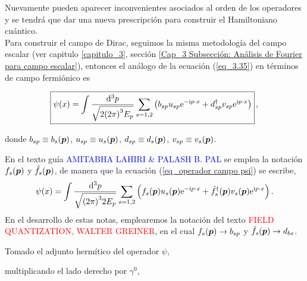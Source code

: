 Nuevamente pueden aparecer inconvenientes asociados al orden de los operadores y se tendrá que dar una nueva prescripción para construir el Hamiltoniano cuántico.\\

Para construir el campo de Dirac, seguimos la misma metodología del campo escalar (ver capitulo \ref{capitulo_3}, sección \ref{Cap_3 Subsección: Análisis de Fourier para campo escalar}), entonces el análogo de la ecuación (\ref{eq_3.35}) en términos de campo fermiónico es

\newcommand{\Opsi}{\psi}
\newcommand{\Od}{d}

\begin{equation}
	\boxed{\Opsi(x) = \int \frac{\dd[3]{p}}{ \sqrt{2\qty( 2\pi )^3 E_p }} \sum_{s=1,2} \qty( \Ob_{sp} u_{sp} \ee^{-\ii p \cdot x} + \Od^\dag_{sp} v_{sp} \ee^{\ii p\cdot x } ) } \, ,
	\label{eq_operador campo psi}
\end{equation}

donde $b_{sp} \equiv b_s(\vb*{p})$, $u_{sp} \equiv u_s (\vb*{p})$, $\Od_{sp} \equiv \Od_s(\vb*{p})$, $v_{sp} \equiv v_s (\vb*{p})$. 

\begin{cabox}
	En el texto guía \textcolor{blue}{ AMITABHA LAHIRI \& PALASH B. PAL} se emplea la notación $f_s(\vb*{p})$ y $\hat{f}_s(\vb*{p})$, de manera que la ecuación (\ref{eq_operador campo psi}) se escribe, 
	\begin{equation*}
		\psi(x) = \int \frac{\dd[3]{p}}{ \sqrt{\qty( 2\pi )^3 2 E_p }} \sum_{s=1,2} \qty( f_{s} (\vb*{p}) u_{s} (\vb*{p}) \mathrm{e}^{-\mathrm{i} p \cdot x} + \hat{f}^\dag_{s} (\vb*{p}) v_{s} (\vb*{p}) \mathrm{e}^{\mathrm{i} p\cdot x } ) \, .
	\end{equation*}
	En el desarrollo de estas notas, emplearemos la notación del texto \textcolor{red}{FIELD QUANTIZATION, WALTER GREINER},	en el cual $f_s(\vb*{p}) \to b_{sp} $ y $\hat{f}_s(\vb*{p}) \to \Od_{bs}$.
\end{cabox}  

Tomado el adjunto hermítico del operador $\Opsi$,


multiplicando el lado derecho por $\gamma^0$,

 
